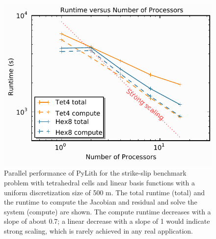 \begin{figure}[htbp]
  \includegraphics[scale=0.75]{benchmarks/figs/strikeslip_scaling}
  \caption{Parallel performance of PyLith for the strike-slip
    benchmark problem with tetrahedral cells and linear basis
    functions with a uniform discretization size of 500 m. The total
    runtime (total) and the runtime to compute the Jacobian and
    residual and solve the system (compute) are shown.  The compute
    runtime decreases with a slope of about 0.7; a linear decrease
    with a slope of 1 would indicate strong scaling, which is rarely
    achieved in any real
    application.}
  \label{fig:benchmark:strikeslip:scaling}
\end{figure}

